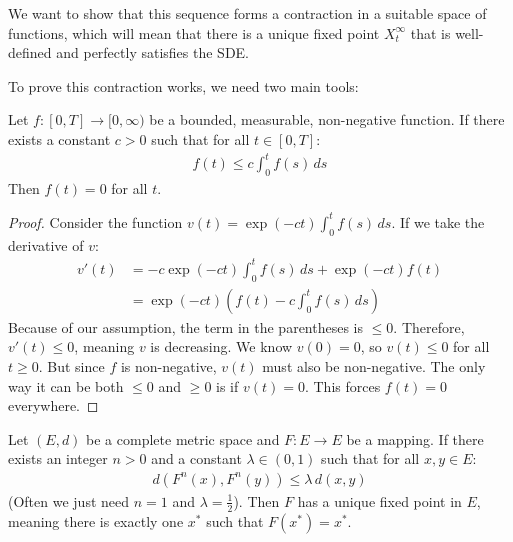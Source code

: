 We want to show that this sequence forms a contraction in a suitable space of functions, which will mean that there is a unique fixed point $X^\infty_t$ that is well-defined and perfectly satisfies the SDE. 

To prove this contraction works, we need two main tools:

\begin{lema}
    Let $f: [0, T] \to [0, \infty)$ be a bounded, measurable, non-negative function. If there exists a constant $c > 0$ such that for all $t \in [0, T]$:
    \begin{align*}
        f(t) \leq c \int_0^t f(s) \, ds
    \end{align*}
    Then $f(t) = 0$ for all $t$.
\end{lema}

\begin{proof}
    Consider the function $v(t) = \exp(-ct) \int_0^t f(s) \, ds$. If we take the derivative of $v$:
    \begin{align*}
        v'(t) &= -c \exp(-ct) \int_0^t f(s) \, ds + \exp(-ct) f(t) \\
              &= \exp(-ct) \left( f(t) - c \int_0^t f(s) \, ds \right)
    \end{align*}
    Because of our assumption, the term in the parentheses is $\leq 0$. Therefore, $v'(t) \leq 0$, meaning $v$ is decreasing. We know $v(0) = 0$, so $v(t) \leq 0$ for all $t \geq 0$. But since $f$ is non-negative, $v(t)$ must also be non-negative. The only way it can be both $\leq 0$ and $\geq 0$ is if $v(t) = 0$. This forces $f(t) = 0$ everywhere.
\end{proof}

\begin{lema}
    Let $(E, d)$ be a complete metric space and $F: E \to E$ be a mapping. If there exists an integer $n > 0$ and a constant $\lambda \in (0, 1)$ such that for all $x, y \in E$:
    \begin{align*}
        d(F^n(x), F^n(y)) \leq \lambda \, d(x,y)
    \end{align*}
    (Often we just need $n=1$ and $\lambda = \frac{1}{2}$). 
    Then $F$ has a unique fixed point in $E$, meaning there is exactly one $x^*$ such that $F(x^*) = x^*$.
\end{lema}

\obvs

